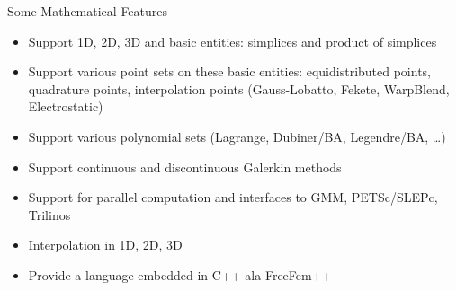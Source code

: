 \documentclass[final,utf8,,hyperref={pdfpagelabels=false}]{beamer}
\begin{document}
\begin{frame}[containsverbatim]{}
\begin{columns}[t]
    \begin{block}{Some Mathematical Features}
      \begin{itemize}
      \item Support 1D, 2D, 3D and basic entities: simplices and product of simplices
      \item Support various point sets on these basic entities: equidistributed
        points, quadrature points, interpolation points (Gauss-Lobatto, Fekete,
        WarpBlend, Electrostatic)
      \item Support various polynomial sets (Lagrange, Dubiner/BA, Legendre/BA,
        \dots)
      \item Support continuous and discontinuous Galerkin methods
      \item Support for parallel computation and interfaces to GMM, PETSc/SLEPc,
        Trilinos
      \item Interpolation in 1D, 2D, 3D
      \item Provide a language embedded in C++ ala FreeFem++
      \end{itemize}
    \end{block}


\end{columns}
\end{frame}
\end{document}
